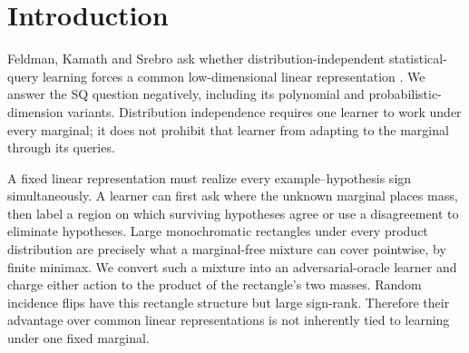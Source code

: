 \section{Introduction}
Feldman, Kamath and Srebro ask whether distribution-independent statistical-query learning forces a common low-dimensional linear representation \citep{FKS26}. We answer the SQ question negatively, including its polynomial and probabilistic-dimension variants. Distribution independence requires one learner to work under every marginal; it does not prohibit that learner from adapting to the marginal through its queries.

A fixed linear representation must realize every example--hypothesis sign simultaneously. A learner can first ask where the unknown marginal places mass, then label a region on which surviving hypotheses agree or use a disagreement to eliminate hypotheses. Large monochromatic rectangles under every product distribution are precisely what a marginal-free mixture can cover pointwise, by finite minimax. We convert such a mixture into an adversarial-oracle learner and charge either action to the product of the rectangle's two masses. Random incidence flips have this rectangle structure but large sign-rank. Therefore their advantage over common linear representations is not inherently tied to learning under one fixed marginal.

